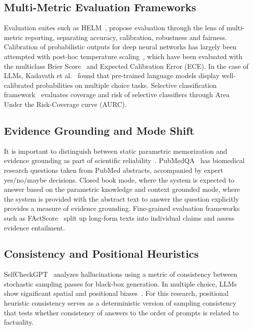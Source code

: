 \documentclass[sigconf,nonacm]{acmart}
\makeatletter
\DeclareRobustCommand{\_}{\ifmmode\nfss@text{\textunderscore}\else\textunderscore\allowbreak\fi}
\makeatother
\begin{document}
\subsection{Multi-Metric Evaluation Frameworks}
Evaluation suites such as HELM~\cite{liang2022holistic}, propose evaluation through the lens of multi-metric reporting, separating accuracy, calibration, robustness and fairness. Calibration of probabilistic outputs for deep neural networks has largely been attempted with post-hoc temperature scaling~\cite{guo2017calibration}, which have been evaluated with the multiclass Brier Score~\cite{brier1950verification} and Expected Calibration Error (ECE). In the case of LLMs, Kadavath et al.~\cite{kadavath2022language} found that pre-trained language models display well-calibrated probabilities on multiple choice tasks. Selective classification framework~\cite{geifman2017selective} evaluates coverage and risk of selective classifiers through Area Under the Risk-Coverage curve (AURC).

\subsection{Evidence Grounding and Mode Shift}
It is important to distinguish between static parametric memorization and evidence grounding as part of scientific reliability~\cite{lewis2020rag}. PubMedQA~\cite{jin2019pubmedqa} has biomedical research questions taken from PubMed abstracts, accompanied by expert yes/no/maybe decisions. Closed book mode, where the system is expected to answer based on the parametric knowledge and context grounded mode, where the system is provided with the abstract text to answer the question explicitly provides a measure of evidence grounding. Fine-grained evaluation frameworks such as FActScore~\cite{min2023factscore} split up long-form texts into individual claims and assess evidence entailment.

\subsection{Consistency and Positional Heuristics}
SelfCheckGPT~\cite{manakul2023selfcheckgpt} analyzes hallucinations using a metric of consistency between stochastic sampling passes for black-box generation. In multiple choice, LLMs show significant spatial and positional biases~\cite{zheng2024large}. For this research, positional heuristic consistency serves as a deterministic version of sampling consistency that tests whether consistency of answers to the order of prompts is related to factuality.
\end{document}
